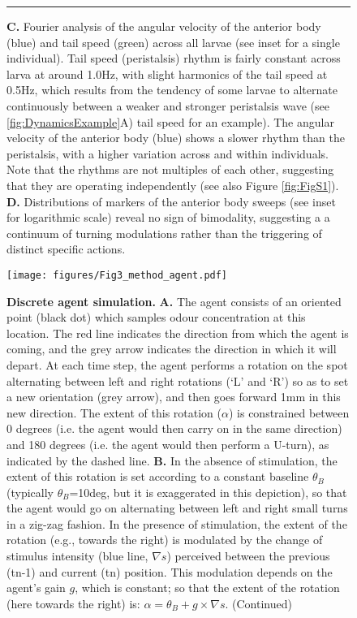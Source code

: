 \documentclass[11pt,a4paper]{article}
\begin{document}
\begin{figure}
\begin{center}
\ContinuedFloat
\caption{
{\bf C.} Fourier analysis of the angular velocity of the anterior body (blue) and tail speed (green) across all larvae (see inset for a single individual). Tail speed (peristalsis) rhythm is fairly constant across larva at around 1.0Hz, with slight harmonics of the tail speed at 0.5Hz, which results from the tendency of some larvae to alternate continuously between a weaker and stronger peristalsis wave (see \ref{fig:DynamicsExample}A) tail speed for an example). The angular velocity of the anterior body (blue) shows a slower rhythm than the peristalsis, with a higher variation across and within individuals. Note that the rhythms are not multiples of each other, suggesting that they are operating independently (see also Figure \ref{fig:FigS1}).
 {\bf D.} Distributions of markers of the anterior body sweeps (see inset for logarithmic scale) reveal no sign of bimodality, suggesting a a continuum of turning modulations rather than the triggering of distinct specific actions.
\label{fig:GroupAnalysis}
}
\hrule
\end{center}
\end{figure}


\begin{figure}
\begin{center}
\texttt{[image: figures/Fig3\_method\_agent.pdf]}
\caption{
{\bf Discrete agent simulation.}
{\bf A.} The agent consists of an oriented point (black dot) which samples odour concentration at this location. The red line indicates the direction from which the agent is coming, and the grey arrow indicates the direction in which it will depart. At each time step, the agent performs a rotation on the spot alternating between left and right rotations (`L' and `R') so as to set a new orientation (grey arrow), and then goes forward 1mm in this new direction. The extent of this rotation ($\alpha$) is constrained between 0 degrees (i.e. the agent would then carry on in the same direction) and 180 degrees (i.e. the agent would then perform a U-turn), as indicated by the dashed line.
{\bf B.} In the absence of stimulation, the extent of this rotation is set according to a constant baseline $\theta_{B}$ (typically $\theta_{B}$=10deg, but it is exaggerated in this depiction), so that the agent would go on alternating between left and right small turns in a zig-zag fashion.
 In the presence of stimulation, the extent of the rotation (e.g., towards the right) is modulated by the change of stimulus intensity (blue line, $\nabla s$) perceived between the previous (tn-1) and current (tn) position. This modulation depends on the agent's gain $g$, which is constant; so that the extent of the rotation (here towards the right) is: $\alpha=\theta_{B}+g\times\nabla s$. (Continued)
\label{fig:MethodAgent}
}
\end{center}
\end{figure}
\end{document}
